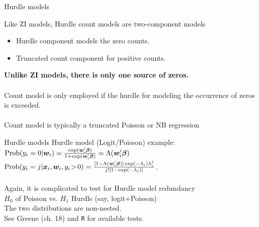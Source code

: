 \documentclass[usenames,dvipsnames]{beamer}
\begin{document}
\begin{frame}{Hurdle models}

Like ZI models, Hurdle count models are two-component models\\
\bigskip
\begin{itemize}
    \item Hurdle component models the zero counts.
    \item Truncated count component for positive counts.
\end{itemize}
\bigskip
\textbf{Unlike ZI models, there is only one source of zeros.}\\
~\\
Count model is only employed if the hurdle for modeling the occurrence of zeros is exceeded. \\
~\\
Count model is typically a truncated Poisson or NB regression
\end{frame}
\begin{frame}{Hurdle models}
Hurdle model (Logit/Poisson) example:\\
\bigskip
$\textnormal{Prob}(y_i=0|\bm{w}_i) = \frac{\exp(\bm{w}_i^{\prime}\bm{\beta})}{1+\exp(\bm{w}_i^{\prime}\bm{\beta})} = \Lambda(\bm{w}_i^{\prime}\bm{\beta}) $\\
\bigskip
$\textnormal{Prob}(y_i=j|\bm{x}_i,\bm{w}_i, y_i\!>\!0) = \frac{[1-\Lambda(\bm{w}_i^{\prime}\bm{\beta})]\exp(-\lambda_i)\lambda_i^j}{j![1-\exp(-\lambda_i)]}$.\\
~\\
\bigskip
Again, it is complicated to test for Hurdle model redundancy \\$H_0$ of Poisson vs. $H_1$ Hurdle (say, logit+Poisson) \\
\medskip
The two distributions are non-nested. \\
See Greene (ch. 18) and \texttt{R} for available tests.
\end{frame}
\end{document}
